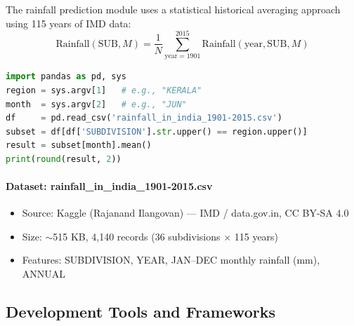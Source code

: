 The rainfall prediction module uses a statistical historical averaging approach using 115 years of IMD data:
\begin{equation}
\text{Rainfall}(\text{SUB}, M) = \frac{1}{N} \sum_{\text{year}=1901}^{2015} \text{Rainfall}(\text{year}, \text{SUB}, M)
\label{eq:rainfall}
\end{equation}

\begin{lstlisting}[language=Python, caption={Rainfall Lookup Implementation}, label={lst:rainfall}]
import pandas as pd, sys
region = sys.argv[1]   # e.g., "KERALA"
month  = sys.argv[2]   # e.g., "JUN"
df     = pd.read_csv('rainfall_in_india_1901-2015.csv')
subset = df[df['SUBDIVISION'].str.upper() == region.upper()]
result = subset[month].mean()
print(round(result, 2))
\end{lstlisting}

\paragraph{Dataset: rainfall\_in\_india\_1901-2015.csv}
\begin{itemize}
    \item Source: Kaggle (Rajanand Ilangovan) --- IMD / data.gov.in, CC BY-SA 4.0 \cite{ref9}
    \item Size: $\sim$515 KB, 4,140 records (36 subdivisions $\times$ 115 years)
    \item Features: SUBDIVISION, YEAR, JAN--DEC monthly rainfall (mm), ANNUAL
\end{itemize}

\subsection{Development Tools and Frameworks}

